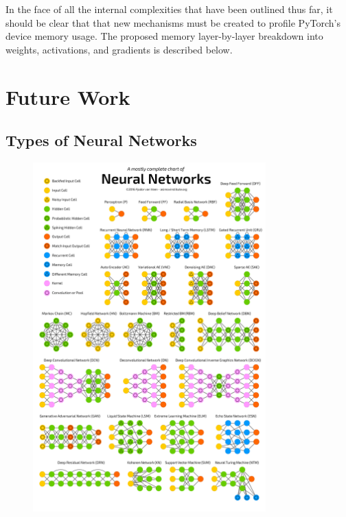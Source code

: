 \documentclass[12pt,letterpaper]{article}
\begin{document}


In the face of all the internal complexities that have been outlined thus far, it should be clear that that new mechanisms must be created to profile PyTorch's device memory usage. The proposed memory layer-by-layer breakdown into weights, activations, and gradients is described below.
\par 



\section{Future Work}
\label{future_work}

\newpage
\begin{appendices}
\section{Types of Neural Networks}
\label{appendix:types_of_networks}
\begin{figure}[ht]
\centering
\includegraphics[width=0.8\textwidth]{types_of_NN.png}
\end{figure}
\end{appendices}



\newpage
\printbibliography
\end{document}
